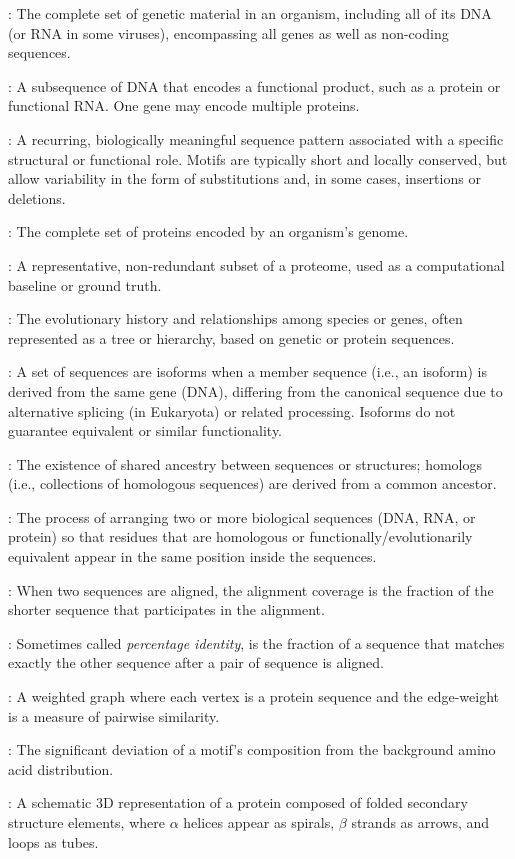 \documentclass[a4paper,12pt]{extarticle}
\begin{document}
\begin{description}[leftmargin=1.2em]
    \item[Genome]: The complete set of genetic material in an organism, including all of its DNA (or RNA in some viruses), encompassing all genes as well as non-coding sequences.
    \item[Gene]: A subsequence of DNA that encodes a functional product, such as a protein or functional RNA. One gene may encode multiple proteins.
    \item[Motif]: A recurring, biologically meaningful sequence pattern associated with a specific structural or functional role. Motifs are typically short and locally conserved, but allow variability in the form of substitutions and, in some cases, insertions or deletions.
    \item[Proteome]: The complete set of proteins encoded by an organism's genome.  
    \item[Reference Proteome]: A representative, non-redundant subset of a proteome, used as a computational baseline or ground truth.
    \item[Phylogeny]: The evolutionary history and relationships among species or genes, often represented as a tree or hierarchy, based on genetic or protein sequences.
    \item[Isoforms]: A set of sequences are isoforms when a member sequence (i.e., an isoform) is derived from the same gene (DNA), differing from the canonical sequence due to alternative splicing (in Eukaryota) or related processing. Isoforms do not guarantee equivalent or similar functionality.
    \item[Homology]: The existence of shared ancestry between sequences or structures; homologs (i.e., collections of homologous sequences) are derived from a common ancestor.
    \item[Sequence Alignment]: The process of arranging two or more biological sequences (DNA, RNA, or protein) so that residues that are homologous or functionally/evolutionarily equivalent appear in the same position inside the sequences.
    \item[Alignment Coverage]: When two sequences are aligned, the alignment coverage is the fraction of the shorter sequence that participates in the alignment.
    \item[Sequence Identity]: Sometimes called \textit{percentage identity}, is the fraction of a sequence that matches exactly the other sequence after a pair of sequence is aligned.
    \item[Protein Sequence Similarity Network (PSSN)]: A weighted graph where each vertex is a protein sequence and the edge-weight is a measure of pairwise similarity.
    \item[Compositional Bias]: The significant deviation of a motif's composition from the background amino acid distribution.
    \item[Ribbon Diagram]: A schematic 3D representation of a protein composed of folded secondary structure elements, where \(\alpha\) helices appear as spirals, \(\beta\) strands as arrows, and loops as tubes.


\end{description}
\end{document}
